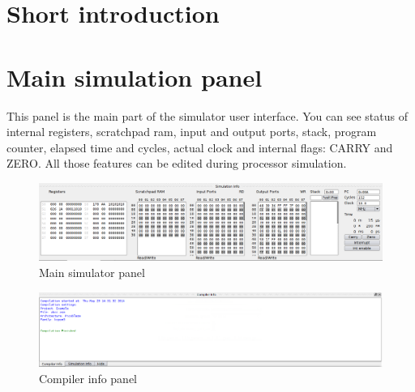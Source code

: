 \section{Short introduction}



\section{Main simulation panel}
This panel is the main part of the simulator user interface.
You can see status of internal registers, scratchpad ram, input and output ports, stack, program counter, elapsed time and cycles, actual clock and internal flags: CARRY and ZERO. All those features can be edited during processor simulation.

   \begin{figure}[h!]
        \centering
        \includegraphics[width=\textwidth]{img/bottom_panel.png}
        \caption{Main simulator panel}
    \end{figure}


   \begin{figure}[h!]
        \centering
        \includegraphics[width=\textwidth]{img/compiler_panel.png}
        \caption{Compiler info panel}
    \end{figure}

